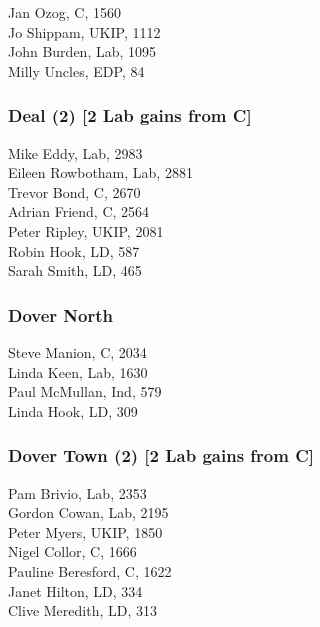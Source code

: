 \documentclass[a4paper,openany,10pt]{book}
\begin{document}


Jan Ozog, C, 1560\\
Jo Shippam, UKIP, 1112\\
John Burden, Lab, 1095\\
Milly Uncles, EDP, 84\\


\subsubsection*{Deal (2) \hspace*{\fill}\nolinebreak[1]%
\enspace\hspace*{\fill}
[2 Lab gains from C]}



Mike Eddy, Lab, 2983\\
Eileen Rowbotham, Lab, 2881\\
Trevor Bond, C, 2670\\
Adrian Friend, C, 2564\\
Peter Ripley, UKIP, 2081\\
Robin Hook, LD, 587\\
Sarah Smith, LD, 465\\


\subsubsection*{Dover North}



Steve Manion, C, 2034\\
Linda Keen, Lab, 1630\\
Paul McMullan, Ind, 579\\
Linda Hook, LD, 309\\


\subsubsection*{Dover Town (2) \hspace*{\fill}\nolinebreak[1]%
\enspace\hspace*{\fill}
[2 Lab gains from C]}



Pam Brivio, Lab, 2353\\
Gordon Cowan, Lab, 2195\\
Peter Myers, UKIP, 1850\\
Nigel Collor, C, 1666\\
Pauline Beresford, C, 1622\\
Janet Hilton, LD, 334\\
Clive Meredith, LD, 313\\
\end{document}
